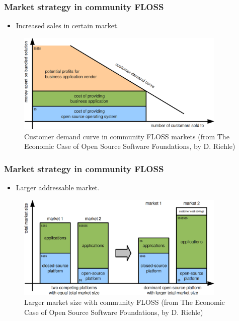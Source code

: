 
\begin{frame}
\frametitle{Market strategy in community FLOSS}

\begin{itemize}
 \item Increased sales in certain market.
\end{itemize}

\begin{center}
  \begin{figure}
    \includegraphics[width=10cm]{figs/customer-demand-curve-floss.png}
    \caption{Customer demand curve in community FLOSS markets (from The Economic
Case of Open Source Software Foundations, by D. Riehle)} 
  \end{figure}
\end{center}

\end{frame}


\begin{frame}
\frametitle{Market strategy in community FLOSS}

\begin{itemize}
 \item Larger addressable market.
\end{itemize}

\begin{center}
  \begin{figure}
    \includegraphics[width=10cm]{figs/growing-floss-platforms-market.png}
    \caption{Larger market size with community FLOSS (from The Economic
Case of Open Source Software Foundations, by D. Riehle)} 
  \end{figure}
\end{center}

\end{frame}

